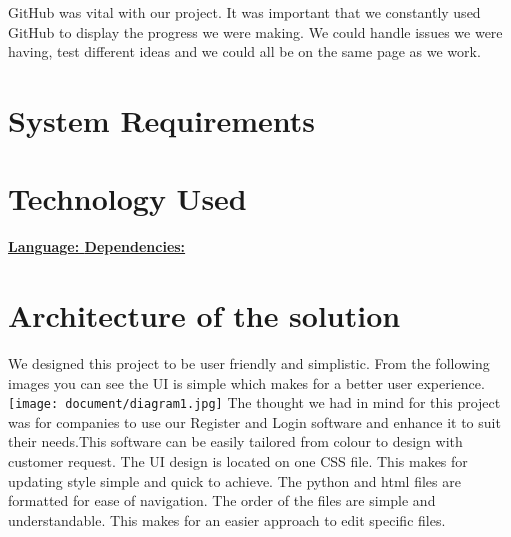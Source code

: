 \documentclass{article}
\begin{document}
GitHub was vital with our project. It was important that we constantly used GitHub to display the progress we were making. We could handle issues we were having, test different ideas and we could all be on the same page as we work.

\maketitle
\section{System Requirements}
 \newline
{}\newline
{}\newline
{}

\maketitle
\section{Technology Used}
\textbf{\underline{Language: }}\newline
\newline
{}\newline
\newline
\textbf{\underline{Dependencies: }}\newline
\newline
{}\newline
{}\newline
{}\newline
{}\newline

\maketitle

\newpage
\section{Architecture of the solution }
We designed this project to be user friendly and simplistic. From the following images you can see the UI is simple which makes for a better user experience.
\texttt{[image: document/diagram1.jpg]}
The thought we had in mind for this project was for companies to use our Register and Login software and enhance it to suit their needs.This software can be easily tailored from colour to design with customer request.
The UI design is located on one CSS file. This makes for updating style simple and quick to achieve.
The python and html files are formatted for ease of navigation. The order of the files are simple and understandable. This makes for an easier approach to edit specific files.
\end{document}

